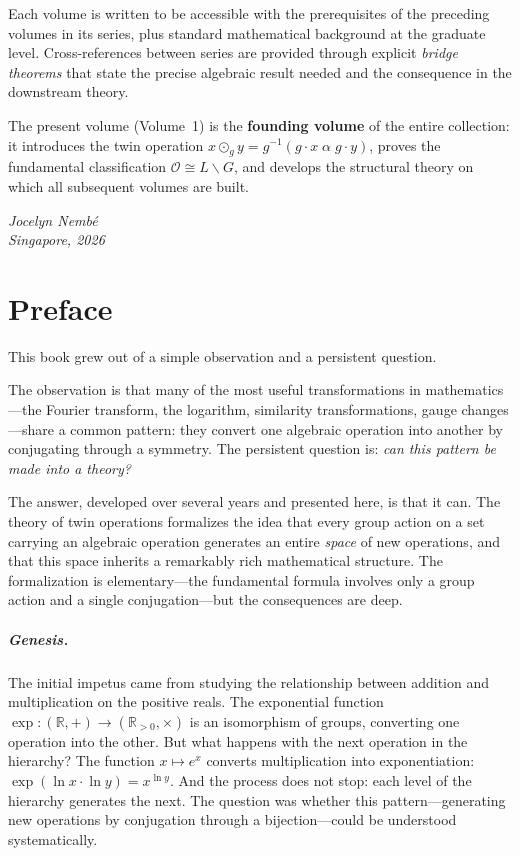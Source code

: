 \documentclass[11pt,a4paper,openany]{book}
\theoremstyle{plain}
\theoremstyle{definition}
\newcommand{\twing}[1]{\odot_{#1}}
\newcommand{\opspace}{\mathcal{O}}
\newcommand{\lingroup}{L}
\newcommand{\groupG}{G}
\newcommand{\RR}{\mathbb{R}}
\begin{document}
Each volume is written to be accessible with the prerequisites of the preceding volumes in its series, plus standard mathematical background at the graduate level. Cross-references between series are provided through explicit \emph{bridge theorems} that state the precise algebraic result needed and the consequence in the downstream theory.

The present volume (Volume~1) is the \textbf{founding volume} of the entire collection: it introduces the twin operation $x \twing{g} y = g^{-1}(g \cdot x \;\alpha\; g \cdot y)$, proves the fundamental classification $\opspace \cong \lingroup\backslash\groupG$, and develops the structural theory on which all subsequent volumes are built.

\vspace{0.5cm}
\begin{flushright}
\textit{Jocelyn Nemb\'e}\\
\textit{Singapore, 2026}
\end{flushright}

\cleardoublepage

\chapter*{Preface}

This book grew out of a simple observation and a persistent question.

The observation is that many of the most useful transformations in mathematics---the Fourier transform, the logarithm, similarity transformations, gauge changes---share a common pattern: they convert one algebraic operation into another by conjugating through a symmetry. The persistent question is: \emph{can this pattern be made into a theory?}

The answer, developed over several years and presented here, is that it can. The theory of twin operations formalizes the idea that every group action on a set carrying an algebraic operation generates an entire \emph{space} of new operations, and that this space inherits a remarkably rich mathematical structure. The formalization is elementary---the fundamental formula involves only a group action and a single conjugation---but the consequences are deep.

\paragraph{Genesis.} The initial impetus came from studying the relationship between addition and multiplication on the positive reals. The exponential function $\exp: (\RR, +) \to (\RR_{>0}, \times)$ is an isomorphism of groups, converting one operation into the other. But what happens with the next operation in the hierarchy? The function $x \mapsto e^x$ converts multiplication into exponentiation: $\exp(\ln x \cdot \ln y) = x^{\ln y}$. And the process does not stop: each level of the hierarchy generates the next. The question was whether this pattern---generating new operations by conjugation through a bijection---could be understood systematically.
\end{document}
